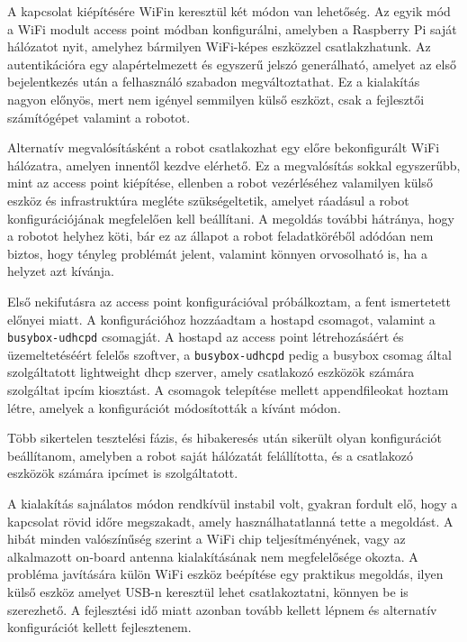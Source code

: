 A kapcsolat kiépítésére WiFin keresztül két módon van lehetőség. Az egyik mód a
WiFi modult access point módban konfigurálni, amelyben a Raspberry Pi saját
hálózatot nyit, amelyhez bármilyen WiFi-képes eszközzel csatlakzhatunk. Az
autentikációra egy alapértelmezett és egyszerű jelszó generálható, amelyet az
első bejelentkezés után a felhasználó szabadon megváltoztathat. Ez a kialakítás
nagyon előnyös, mert nem igényel semmilyen külső eszközt, csak a fejlesztői
számítógépet valamint a robotot.

Alternatív megvalósításként a robot csatlakozhat egy előre bekonfigurált WiFi
hálózatra, amelyen innentől kezdve elérhető. Ez a megvalósítás sokkal egyszerűbb,
mint az access point kiépítése, ellenben a robot vezérléséhez valamilyen külső
eszköz és infrastruktúra megléte szükségeltetik, amelyet ráadásul a robot
konfigurációjának megfelelően kell beállítani. A megoldás további hátránya, hogy
a robotot helyhez köti, bár ez az állapot a robot feladatköréből adódóan nem
biztos, hogy tényleg problémát jelent, valamint könnyen orvosolható is, ha a
helyzet azt kívánja. 

\medskip

Első nekifutásra az access point konfigurációval próbálkoztam, a fent ismertetett
előnyei miatt. A konfigurációhoz hozzáadtam a hostapd csomagot, valamint a
\verb|busybox-udhcpd| csomagját. A hostapd az access point létrehozásáért és
üzemeltetéséért felelős szoftver, a \verb|busybox-udhcpd| pedig a busybox csomag
által szolgáltatott lightweight dhcp szerver, amely csatlakozó eszközök számára
szolgáltat ipcím kiosztást. A csomagok telepítése mellett appendfileokat hoztam
létre, amelyek a konfigurációt módosították a kívánt módon.

Több sikertelen tesztelési fázis, és hibakeresés után sikerült olyan
konfigurációt beállítanom, amelyben a robot saját hálózatát felállította, és a
csatlakozó eszközök számára ipcímet is szolgáltatott.

A kialakítás sajnálatos módon rendkívül instabil volt, gyakran fordult elő, hogy
a kapcsolat rövid időre megszakadt, amely használhatatlanná tette a megoldást. A
hibát minden valószínűség szerint a WiFi chip teljesítményének, vagy az
alkalmazott on-board antenna kialakításának nem megfelelősége okozta. A probléma
javítására külön WiFi eszköz beépítése egy praktikus megoldás, ilyen külső eszköz
amelyet USB-n keresztül lehet csatlakoztatni, könnyen be is szerezhető. A
fejlesztési idő miatt azonban tovább kellett lépnem és alternatív konfigurációt
kellett fejlesztenem.

